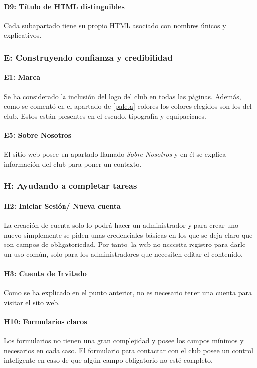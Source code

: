 \documentclass[10pt, spanish, pdftex]{template/UC3M_document}
\begin{document}
\paragraph{D9: Título de HTML distinguibles}
  Cada subapartado tiene su propio HTML asociado con nombres únicos y explicativos.


\subsubsection{E: Construyendo confianza y credibilidad}
\paragraph{E1: Marca}
  Se ha considerado la inclusión del logo del club en todas las páginas. Además, como se comentó en el apartado de \ref{paleta} colores los colores elegidos son los del club. Estos están presentes en el escudo, tipografía y equipaciones.
\paragraph{E5: Sobre Nosotros}
  El sitio web posee un apartado llamado \textit{Sobre Nosotros} y en él se explica información del club para poner un contexto.

\subsubsection{H: Ayudando a completar tareas}
\paragraph{H2: Iniciar Sesión/ Nueva cuenta}
  La creación de cuenta solo lo podrá hacer un administrador y para crear uno nuevo simplemente se piden unas credenciales básicas en los que se deja claro que son campos de obligatoriedad.
  Por tanto, la web no necesita registro para darle un uso común, solo para los administradores que necesiten editar el contenido.
\paragraph{H3: Cuenta de Invitado}
  Como se ha explicado en el punto anterior, no es necesario tener una cuenta para visitar el sito web.
\paragraph{H10: Formularios claros}
  Los formularios no tienen una gran complejidad y posee los campos mínimos y necesarios en cada caso. El formulario para contactar con el club posee un control inteligente en caso de que algún campo obligatorio no esté completo.
\end{document}
